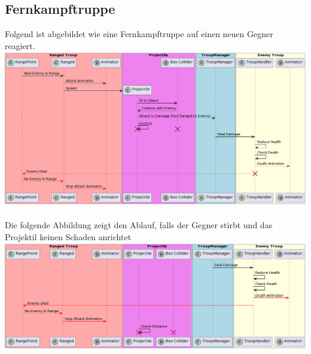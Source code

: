 \subsection{Fernkampftruppe}
Folgend ist abgebildet wie eine Fernkampftruppe auf einen neuen Gegner reagiert.\\
\includegraphics[width=15cm]{resources/RangedAttacks.png} \\
\\
Die folgende Abbildung zeigt den Ablauf, falls der Gegner stirbt und das Projektil keinen Schaden anrichtet\\
\includegraphics[width=15cm]{resources/Projectile.png}

